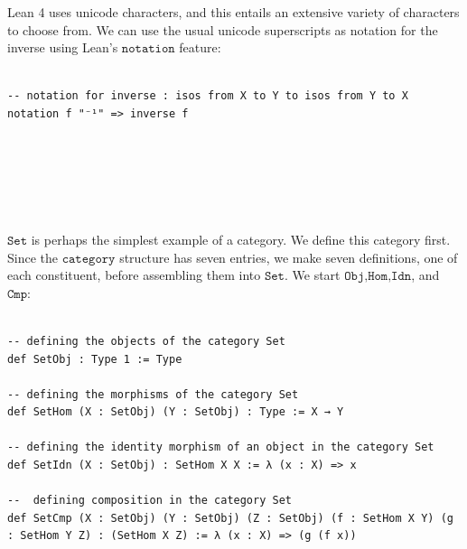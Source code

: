 \documentclass{book}
\newcounter{lcounter}
\newcounter{sectioncount}
\newcounter{subsectioncount}
\renewcommand{\section}[1]{\newpage
\ \\
\ \\
 \begin{center} \scalebox{1.5}{\texttt{\thesectioncount . #1}} \setcounter{sectioncount}{\thesectioncount+1} \setcounter{subsectioncount}{1} \end{center}
 \begin{center}

\ \\
\ \\

\thispagestyle{empty}
\end{center}
}
\begin{document}
Lean 4 uses unicode characters, and this entails an extensive variety of characters to choose from. We can use the usual unicode superscripts as notation for the inverse using Lean's $\texttt{notation}$ feature:

\begin{center}
\begin{tcolorbox}[width=5in,colback={white},title={\begin{center}\texttt{Lean \thelcounter} \addtocounter{lcounter}{1}  \end{center}},colbacktitle=Green,coltitle=black]
\begin{verbatim}

-- notation for inverse : isos from X to Y to isos from Y to X
notation f "⁻¹" => inverse f

\end{verbatim}%
\end{tcolorbox}
\end{center}

\section{\texttt{Set}}

$\texttt{Set}$ is perhaps the simplest example of a category. We define this category first. Since the $\texttt{category}$ structure has seven entries, we make seven definitions, one of each constituent, before assembling them into $\texttt{Set}$. We start $\texttt{Obj,Hom,Idn}$, and $\texttt{Cmp}$:\\

\begin{center}
\begin{tcolorbox}[width=5in,colback={white},title={\begin{center}\texttt{Lean \thelcounter} \addtocounter{lcounter}{1}  \end{center}},colbacktitle=Blue,coltitle=black]
\begin{verbatim}

-- defining the objects of the category Set
def SetObj : Type 1 := Type

-- defining the morphisms of the category Set
def SetHom (X : SetObj) (Y : SetObj) : Type := X → Y

-- defining the identity morphism of an object in the category Set
def SetIdn (X : SetObj) : SetHom X X := λ (x : X) => x

--  defining composition in the category Set
def SetCmp (X : SetObj) (Y : SetObj) (Z : SetObj) (f : SetHom X Y) (g : SetHom Y Z) : (SetHom X Z) := λ (x : X) => (g (f x)) 

\end{verbatim}%
\end{tcolorbox}
\end{center}
\end{document}
